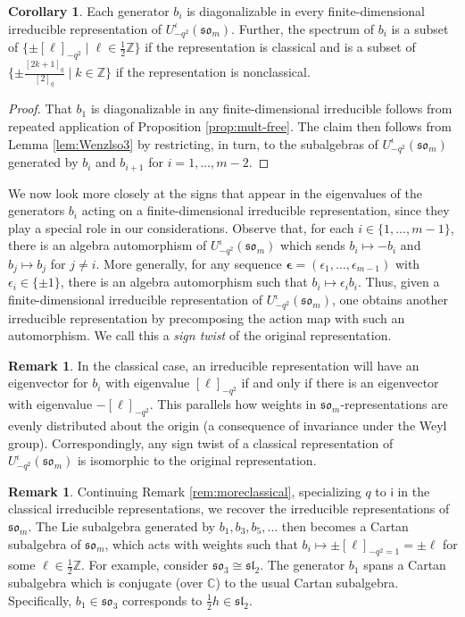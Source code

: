 \documentclass[10pt]{amsart}
\numberwithin{equation}{section}
\theoremstyle{definition}
\newtheorem{cor}[thm]{Corollary}
\newtheorem{rem}[thm]{Remark}
\def\C{{\mathbb C}}
\newcommand{\som}[1][m]{\mathfrak{so}_{#1}}
\newcommand{\iqUsom}[1][m]{{U}^{\iota}_{-q^2}(\som[#1])}
\begin{document}
\begin{cor}\label{cor:biss}
Each generator $b_i$ is diagonalizable in every finite-dimensional irreducible representation of $\iqUsom$.
Further, the spectrum of $b_i$ is a subset of $\{\pm [\ell]_{-q^2} \mid \ell \in \tfrac{1}{2}\mathbb{Z} \}$ if the representation is classical
and is a subset of $\{\pm \frac{[2k+1]_q}{[2]_q} \mid k \in \mathbb{Z} \}$ if the representation is nonclassical.
	\end{cor}
\begin{proof}
That $b_1$ is diagonalizable in any finite-dimensional irreducible follows 
from repeated application of Proposition \ref{prop:mult-free}. 
The claim then follows from Lemma \ref{lem:Wenzlso3} by restricting, in turn, 
to the subalgebras of $\iqUsom$ generated by $b_i$ and $b_{i+1}$ for $i=1,\ldots,m-2$.
\end{proof}

We now look more closely at the signs that appear in the eigenvalues of the generators $b_i$ 
acting on a finite-dimensional irreducible representation, 
since they play a special role in our considerations.
Observe that, for each $i\in\{1, \dots, m-1\}$, there is an algebra automorphism of $\iqUsom$ which sends $b_i \mapsto -b_i$ 
and $b_j \mapsto b_j$ for $j\ne i$. 
More generally, for any sequence $\mathbf{\epsilon} = (\epsilon_1, \dots, \epsilon_{m-1})$ with $\epsilon_i \in \{\pm 1\}$, 
there is an algebra automorphism such that $b_i\mapsto \epsilon_ib_i$.
Thus, given a finite-dimensional irreducible representation of $\iqUsom$, 
one obtains another irreducible representation by precomposing the action map with such an automorphism.
We call this a \emph{sign twist} of the original representation.

\begin{rem}\label{rem:sgntwistclassical}
In the classical case, an irreducible representation will have an eigenvector for $b_i$ 
with eigenvalue $[\ell]_{-q^2}$ if and only if there is an eigenvector with eigenvalue $-[\ell]_{-q^2}$. 
This parallels how weights in $\som$-representations are evenly distributed about the origin 
(a consequence of invariance under the Weyl group). 
Correspondingly, any sign twist of a classical representation of $\iqUsom$ 
is isomorphic to the original representation.
\end{rem}

\begin{rem}\label{rem:moremoreclassical}
Continuing Remark \ref{rem:moreclassical}, 
specializing $q$ to $\mathsf{i}$ in the classical irreducible representations, we recover the irreducible representations of $\som$. 
The Lie subalgebra generated by $b_1, b_3, b_5, \ldots$ then becomes a Cartan subalgebra of $\som$, 
which acts with weights such that $b_i\mapsto \pm [\ell]_{-q^2= 1}= \pm \ell$ 
for some $\ell \in \frac{1}{2}\mathbb{Z}$. 
For example, consider $\som[3]\cong\mathfrak{sl}_2$. 
The generator $b_1$ spans a Cartan subalgebra which is conjugate (over $\C$) to the usual Cartan subalgebra. 
Specifically, $b_1\in \mathfrak{so}_3$ corresponds to $\frac{1}{2}h\in \mathfrak{sl}_2$.
\end{rem}
\end{document}
